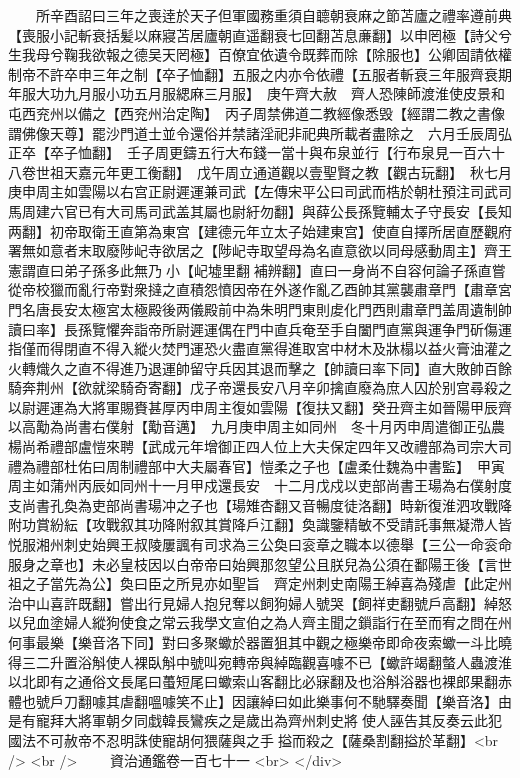 　　所辛酉詔曰三年之喪逹於天子但軍國務重須自聼朝衰麻之節苫廬之禮率遵前典【喪服小記斬衰括髪以麻寢苫居廬朝直遥翻衰七回翻苫息亷翻】以申罔極【詩父兮生我母兮鞠我欲報之德吴天罔極】百僚宜依遺令既葬而除【除服也】公卿固請依權制帝不許卒申三年之制【卒子恤翻】五服之内亦令依禮【五服者斬衰三年服齊衰期年服大功九月服小功五月服緦麻三月服】　庚午齊大赦　齊人恐陳師渡淮使皮景和屯西兖州以備之【西兖州治定陶】　丙子周禁佛道二教經像悉毁【經謂二教之書像謂佛像天尊】罷沙門道士並令還俗并禁諸淫祀非祀典所載者盡除之　六月壬辰周弘正卒【卒子恤翻】　壬子周更鑄五行大布錢一當十與布泉並行【行布泉見一百六十八卷世祖天嘉元年更工衡翻】　戊午周立通道觀以壹聖賢之教【觀古玩翻】　秋七月庚申周主如雲陽以右宫正尉遲運兼司武【左傳宋平公曰司武而梏於朝杜預注司武司馬周建六官已有大司馬司武盖其屬也尉紆勿翻】與薛公長孫覽輔太子守長安【長知两翻】初帝取衛王直第為東宫【建德元年立太子始建東宫】使直自擇所居直歷觀府署無如意者末取廢陟屺寺欲居之【陟屺寺取望母為名直意欲以同母感動周主】齊王憲謂直曰弟子孫多此無乃小【屺墟里翻補辨翻】直曰一身尚不自容何論子孫直嘗從帝校獵而亂行帝對衆撻之直積怨憤因帝在外遂作亂乙酉帥其黨襲肅章門【肅章宮門名唐長安太極宮太極殿後两儀殿前中為朱明門東則䖍化門西則肅章門盖周遺制帥讀曰率】長孫覽懼奔詣帝所尉遲運偶在門中直兵奄至手自闔門直黨與運争門斫傷運指僅而得閉直不得入縱火焚門運恐火盡直黨得進取宮中材木及牀榻以益火膏油灌之火轉熾久之直不得進乃退運帥留守兵因其退而擊之【帥讀曰率下同】直大敗帥百餘騎奔荆州【欲就梁騎奇寄翻】戊子帝還長安八月辛卯擒直廢為庶人囚於别宫尋殺之以尉遲運為大將軍賜賚甚厚丙申周主復如雲陽【復扶又翻】癸丑齊主如晉陽甲辰齊以高勱為尚書右僕射【勱音邁】　九月庚申周主如同州　冬十月丙申周遣御正弘農楊尚希禮部盧愷來聘【武成元年增御正四人位上大夫保定四年又改禮部為司宗大司禮為禮部杜佑曰周制禮部中大夫屬春官】愷柔之子也【盧柔仕魏為中書監】　甲寅周主如蒲州丙辰如同州十一月甲戍還長安　十二月戊戍以吏部尚書王瑒為右僕射度支尚書孔奐為吏部尚書瑒冲之子也【瑒雉杏翻又音暢度徒洛翻】時新復淮泗攻戰降附功賞紛紜【攻戰叙其功降附叙其賞降戶江翻】奐識鑒精敏不受請託事無凝滯人皆悦服湘州刺史始興王叔陵屢諷有司求為三公奐曰衮章之職本以德舉【三公一命衮命服身之章也】未必皇枝因以白帝帝曰始興那忽望公且朕兒為公須在鄱陽王後【言世祖之子當先為公】奐曰臣之所見亦如聖旨　齊定州刺史南陽王綽喜為殘虐【此定州治中山喜許既翻】嘗出行見婦人抱兒奪以飼狗婦人號哭【飼祥吏翻號戶高翻】綽怒以兒血塗婦人縱狗使食之常云我學文宣伯之為人齊主聞之鎻詣行在至而宥之問在州何事最樂【樂音洛下同】對曰多聚蠍於器置狙其中觀之極樂帝即命夜索蠍一斗比曉得三二升置浴斛使人裸臥斛中號叫宛轉帝與綽臨觀喜噱不已【蠍許竭翻螫人蟲渡淮以北即有之通俗文長尾曰蠆短尾曰蠍索山客翻比必寐翻及也浴斛浴器也裸郎果翻赤體也號戶刀翻噱其虐翻嗢噱笑不止】因讓綽曰如此樂事何不馳驛奏聞【樂音洛】由是有寵拜大將軍朝夕同戱韓長鸞疾之是歲出為齊州刺史將使人誣告其反奏云此犯國法不可赦帝不忍明誅使寵胡何猥薩與之手搤而殺之【薩桑割翻搤於革翻】<br />
<br />
　　資治通鑑卷一百七十一  <br>
   </div> 

